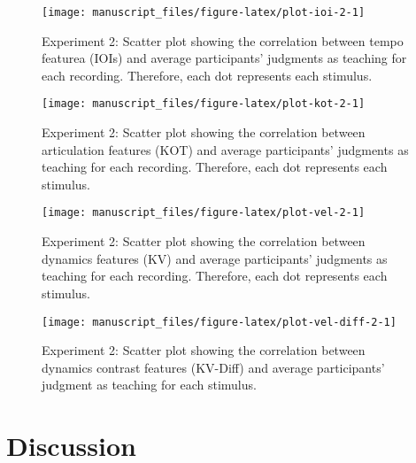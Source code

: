\documentclass[
  man,floatsintext]{apa6}
\begin{document}
\begin{figure}

{\centering \texttt{[image: manuscript\_files/figure-latex/plot-ioi-2-1]} 

}

\caption{\label{fig:ioi-2}Experiment 2: Scatter plot showing the correlation between tempo featurea (IOIs) and average participants' judgments as teaching for each recording. Therefore, each dot represents each stimulus.}\label{fig:plot-ioi-2}
\end{figure}

\begin{figure}

{\centering \texttt{[image: manuscript\_files/figure-latex/plot-kot-2-1]} 

}

\caption{\label{fig:kot-2}Experiment 2: Scatter plot showing the correlation between articulation features (KOT) and average participants' judgments as teaching for each recording. Therefore, each dot represents each stimulus.}\label{fig:plot-kot-2}
\end{figure}

\begin{figure}

{\centering \texttt{[image: manuscript\_files/figure-latex/plot-vel-2-1]} 

}

\caption{\label{fig:vel-2}Experiment 2: Scatter plot showing the correlation between dynamics features (KV) and average participants' judgments as teaching for each recording. Therefore, each dot represents each stimulus.}\label{fig:plot-vel-2}
\end{figure}

\begin{figure}

{\centering \texttt{[image: manuscript\_files/figure-latex/plot-vel-diff-2-1]} 

}

\caption{\label{fig:vel-diff-2}Experiment 2: Scatter plot showing the correlation between dynamics contrast features (KV-Diff) and average participants' judgment as teaching for each stimulus.}\label{fig:plot-vel-diff-2}
\end{figure}

\hypertarget{discussion-1}{%
\section{Discussion}\label{discussion-1}}
\end{document}
